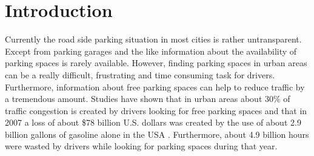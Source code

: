 \chapter{Introduction}
\label{sec:introduction}

Currently the road side parking situation in most cities is rather untransparent. Except from parking garages and the like information about the availability of parking spaces is rarely available. However, finding parking spaces in urban areas can be a really difficult, frustrating and time consuming task for drivers. Furthermore, information about free parking spaces can help to reduce traffic by a tremendous amount. Studies have shown that in urban areas about 30\% of traffic congestion is created by drivers looking for free parking spaces \cite{Nawaz:2013:PSB:2500423.2500438} and that in 2007 a loss of about \$78 billion U.S. dollars was created by the use of about 2.9 billion gallons of gasoline alone in the USA \cite{TexasMobilityReport}. Furthermore, about 4.9 billion hours were wasted by drivers while looking for parking spaces during that year. 